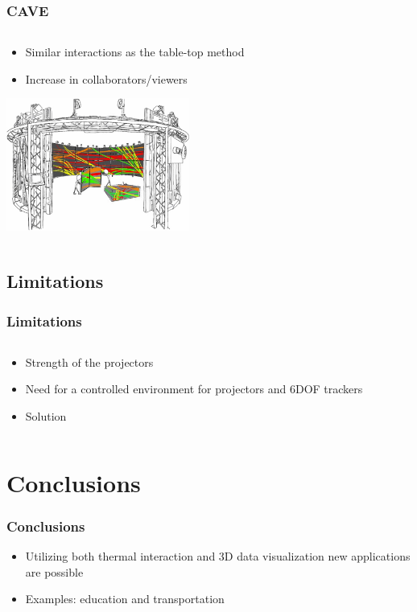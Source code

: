 \documentclass{beamer}
\begin{document}
\begin{frame}
\frametitle{CAVE}
\begin{columns}
    \begin{column}{0.7\textwidth}
    \begin{itemize}
		\item Similar interactions as the table-top method
		\item Increase in collaborators/viewers
	\end{itemize}
		\begin{center}
	\includegraphics[width=6cm]{../Sample_paper/images/CAVE}
		
	\cite{3D}
	\end{center}
	\end{column}
    \end{columns}
\end{frame}

\subsection{Limitations}
\begin{frame}	
\frametitle{Limitations}
    \begin{columns}
    \begin{column}{.8\textwidth}
	\begin{itemize}
		\item Strength of the projectors 
		\item Need for a controlled environment for projectors and 6DOF trackers
		\item Solution
	\end{itemize}
	\end{column}
	\end{columns}
\end{frame}

\section[Conclusions]{Conclusions}
\begin{frame}
\frametitle{Conclusions}
	\begin{itemize}
		\item Utilizing both thermal interaction and 3D data visualization new applications are possible
		\item Examples: education and transportation

	\end{itemize}
\end{frame}
\end{document}
